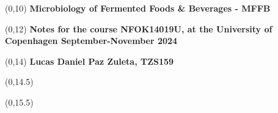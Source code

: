 \begin{titlepage}


\begin{textblock}{9.4}(0,10)
    \Huge{\sffamily\bfseries{Microbiology of Fermented Foods \& Beverages - MFFB}}
\end{textblock}

\begin{textblock}{9.4}(0,12)
    \LARGE{\sffamily\bfseries{Notes for the course NFOK14019U, at the University of Copenhagen September-November 2024}}
\end{textblock}

\begin{textblock}{9.4}(0,14)
    \large{\sffamily\bfseries{Lucas Daniel Paz Zuleta, TZS159}}
\end{textblock}

\begin{textblock}{9.4}(0,14.5)
    \large{}
\end{textblock}

\begin{textblock}{9.4}(0,15.5)
    \large{}
\end{textblock}

\end{titlepage}